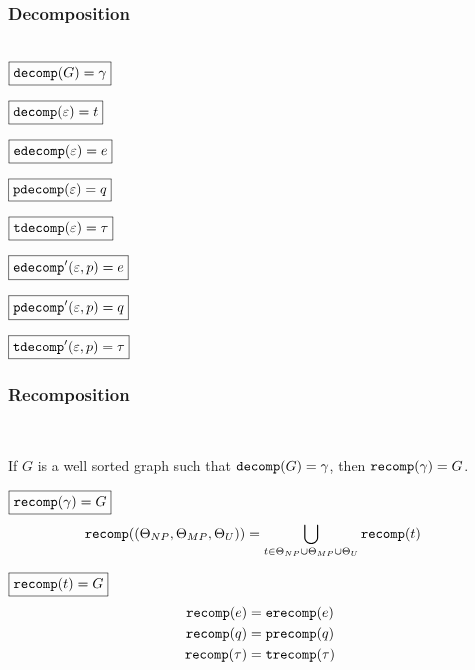 \subsubsection{Decomposition}\hspace*{\fill} \\

\noindent $\boxed{\decomp{G} = \Grove}$
%
\figureDecompositionDefDecomp

\noindent $\boxed{\decomp{\e} = t}$
%
\figureDecompositionDefDecompTerm

\noindent $\boxed{\edecomp{\e} = e}$
%
\figureDecompositionDefEdecomp

\noindent $\boxed{\pdecomp{\e} = q}$
%
\figureDecompositionDefPdecomp

\noindent $\boxed{\tdecomp{\e} = \tau}$
%
\figureDecompositionDefTdecomp

\noindent $\boxed{\edecompPrime{\e}{p} = e}$
%
\figureDecompositionDefEdecompPrime

\noindent $\boxed{\pdecompPrime{\e}{p} = q}$
%
\figureDecompositionDefPdecompPrime

\noindent $\boxed{\tdecompPrime{\e}{p} = \tau}$
%
\figureDecompositionDefTdecompPrime%


\subsubsection{Recomposition}\hspace*{\fill} \\

\begin{theorem}
  If $G$ is a well sorted graph such that $\decomp{G} = \Grove$,
  then $\recomp{\Grove} = G$.
\end{theorem}

\noindent $\boxed{\recomp{\Grove} = G}$
%
\begin{align*}
  \recomp{(\Set[NP], \Set[MP], \Set[U])} &= \bigcup_{t \in \Set[NP] \cup \Set[MP] \cup \Set[U]} \recomp{t}
\end{align*}

\noindent $\boxed{\recomp{t} = G}$
%
\begin{align*}
  \recomp{e} &= \erecomp{e} \\
  \recomp{q} &= \precomp{q} \\
  \recomp{\tau} &= \trecomp{\tau}
\end{align*}

